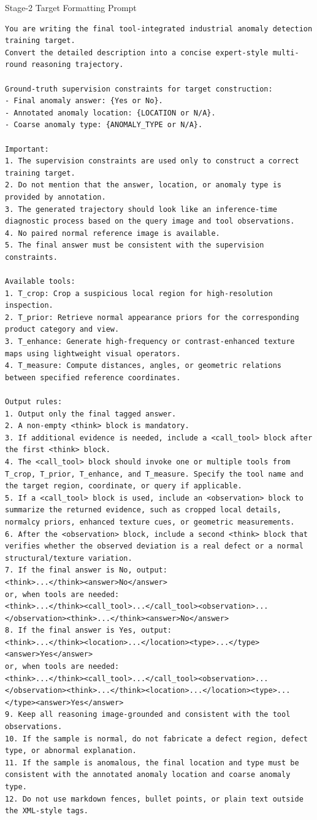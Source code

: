 \documentclass{article}
\begin{document}
{\begin{promptbox}{Stage-2 Target Formatting Prompt}
\begin{lstlisting}[style=promptstyle]
You are writing the final tool-integrated industrial anomaly detection training target.
Convert the detailed description into a concise expert-style multi-round reasoning trajectory.

Ground-truth supervision constraints for target construction:
- Final anomaly answer: {Yes or No}.
- Annotated anomaly location: {LOCATION or N/A}.
- Coarse anomaly type: {ANOMALY_TYPE or N/A}.

Important:
1. The supervision constraints are used only to construct a correct training target.
2. Do not mention that the answer, location, or anomaly type is provided by annotation.
3. The generated trajectory should look like an inference-time diagnostic process based on the query image and tool observations.
4. No paired normal reference image is available.
5. The final answer must be consistent with the supervision constraints.

Available tools:
1. T_crop: Crop a suspicious local region for high-resolution inspection.
2. T_prior: Retrieve normal appearance priors for the corresponding product category and view.
3. T_enhance: Generate high-frequency or contrast-enhanced texture maps using lightweight visual operators.
4. T_measure: Compute distances, angles, or geometric relations between specified reference coordinates.

Output rules:
1. Output only the final tagged answer.
2. A non-empty <think> block is mandatory.
3. If additional evidence is needed, include a <call_tool> block after the first <think> block.
4. The <call_tool> block should invoke one or multiple tools from T_crop, T_prior, T_enhance, and T_measure. Specify the tool name and the target region, coordinate, or query if applicable.
5. If a <call_tool> block is used, include an <observation> block to summarize the returned evidence, such as cropped local details, normalcy priors, enhanced texture cues, or geometric measurements.
6. After the <observation> block, include a second <think> block that verifies whether the observed deviation is a real defect or a normal structural/texture variation.
7. If the final answer is No, output:
<think>...</think><answer>No</answer>
or, when tools are needed:
<think>...</think><call_tool>...</call_tool><observation>...</observation><think>...</think><answer>No</answer>
8. If the final answer is Yes, output:
<think>...</think><location>...</location><type>...</type><answer>Yes</answer>
or, when tools are needed:
<think>...</think><call_tool>...</call_tool><observation>...</observation><think>...</think><location>...</location><type>...</type><answer>Yes</answer>
9. Keep all reasoning image-grounded and consistent with the tool observations.
10. If the sample is normal, do not fabricate a defect region, defect type, or abnormal explanation.
11. If the sample is anomalous, the final location and type must be consistent with the annotated anomaly location and coarse anomaly type.
12. Do not use markdown fences, bullet points, or plain text outside the XML-style tags.
\end{lstlisting}
\end{promptbox}

}
\end{document}
